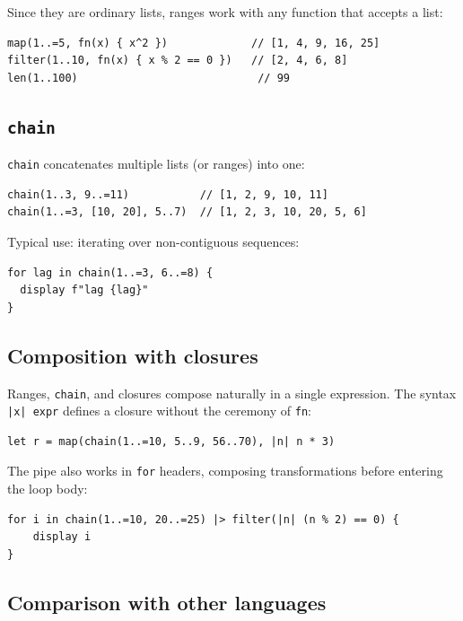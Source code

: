 Since they are ordinary lists, ranges work with any function that accepts
a list:

\begin{lstlisting}
map(1..=5, fn(x) { x^2 })             // [1, 4, 9, 16, 25]
filter(1..10, fn(x) { x % 2 == 0 })   // [2, 4, 6, 8]
len(1..100)                            // 99
\end{lstlisting}

\subsection{\texttt{chain}}

\lstinline{chain} concatenates multiple lists (or ranges) into one:

\begin{lstlisting}[caption={chain with ranges and lists}]
chain(1..3, 9..=11)           // [1, 2, 9, 10, 11]
chain(1..=3, [10, 20], 5..7)  // [1, 2, 3, 10, 20, 5, 6]
\end{lstlisting}

Typical use: iterating over non-contiguous sequences:

\begin{lstlisting}
for lag in chain(1..=3, 6..=8) {
  display f"lag {lag}"
}
\end{lstlisting}

\subsection{Composition with closures}

Ranges, \lstinline{chain}, and closures compose naturally in a single
expression. The syntax \lstinline{|x| expr} defines a closure without the
ceremony of \lstinline{fn}:

\begin{lstlisting}[caption={Composed expression — single line}]
let r = map(chain(1..=10, 5..9, 56..70), |n| n * 3)
\end{lstlisting}

The pipe also works in \lstinline{for} headers, composing transformations
before entering the loop body:

\begin{lstlisting}[caption={Pipeline in the for header}]
for i in chain(1..=10, 20..=25) |> filter(|n| (n % 2) == 0) {
    display i
}
\end{lstlisting}

\subsection{Comparison with other languages}

